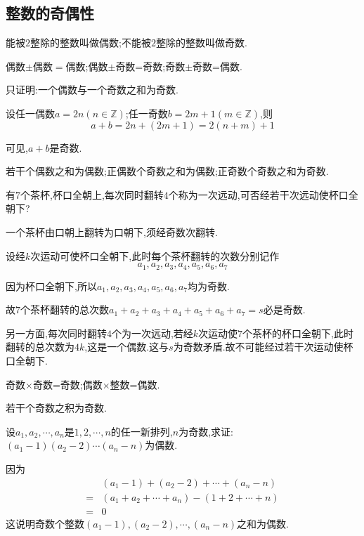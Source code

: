 \subsection{整数的奇偶性}
 能被$2$整除的整数叫做偶数;不能被$2$整除的整数叫做奇数.

\property 偶数$\pm$偶数$=$偶数;偶数$\pm$奇数=奇数;奇数$\pm$奇数=偶数.

只证明:一个偶数与一个奇数之和为奇数.

\proof 设任一偶数$a=2n(n\in\mathbb{Z})$;任一奇数$b=2m+1(m\in\mathbb{Z})$,则
\begin{equation*}
	a+b=2n+(2m+1)=2(n+m)+1
\end{equation*}

可见,$a+b$是奇数.

\corollary 若干个偶数之和为偶数;正偶数个奇数之和为偶数;正奇数个奇数之和为奇数.

\example 有$7$个茶杯,杯口全朝上,每次同时翻转$4$个称为一次远动,可否经若干次远动使杯口全朝下?

\solve 一个茶杯由口朝上翻转为口朝下,须经奇数次翻转.

设经$k$次运动可使杯口全朝下,此时每个茶杯翻转的次数分别记作
\begin{equation*}
	a_{1},a_{2},a_{3},a_{4},a_{5},a_{6},a_{7}
\end{equation*}

因为杯口全朝下,所以$a_{1},a_{2},a_{3},a_{4},a_{5},a_{6},a_{7}$均为奇数.

故$7$个茶杯翻转的总次数$a_{1}+a_{2}+a_{3}+a_{4}+a_{5}+a_{6}+a_{7}=s$必是奇数.

另一方面,每次同时翻转$4$个为一次远动,若经$k$次运动使$7$个茶杯的杯口全朝下,此时翻转的总次数为$4k$,这是一个偶数.这与$s$为奇数矛盾.故不可能经过若干次运动使杯口全朝下.

\property 奇数$\times$奇数=奇数;偶数$\times$整数=偶数.

\corollary 若干个奇数之积为奇数.

\example 设$a_{1},a_{2},\cdots,a_{n}$是$1,2,\cdots,n$的任一新排列,$n$为奇数,求证:$(a_{1}-1)(a_{2}-2)\cdots(a_{n}-n)$为偶数.

\proof 因为
\begin{equation*}
	\begin{split}
		&(a_{1}-1)+(a_{2}-2)+\cdots+(a_{n}-n)\\
		=&(a_{1}+a_{2}+\cdots+a_{n})-(1+2+\cdots+n)\\
		=&0
	\end{split}
\end{equation*}
这说明奇数个整数$(a_{1}-1),(a_{2}-2),\cdots,(a_{n}-n)$之和为偶数.

